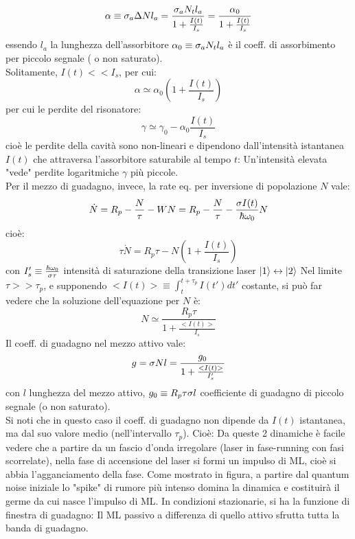 \begin{enumerate}
\begin{equation*}
\alpha \equiv \sigma_a \Delta N l_a = \frac{\sigma_a N_t l_a}{1 + \frac{I(t)}{I_s}} = \frac{\alpha_0}{1 + \frac{I(t)}{I_s}}
\end{equation*}
essendo $l_a$ la lunghezza dell'assorbitore $\alpha_0 \equiv \sigma_a N_t l_a$ è il coeff. di assorbimento per piccolo segnale ( o non saturato).\\
Solitamente, $I(t) << I_s$, per cui:
\begin{equation*}
\alpha \simeq \alpha_0 \left(1 + \frac{I(t)}{I_s}\right)
\end{equation*}
per cui le perdite del risonatore:
\begin{equation*}
\gamma \simeq \gamma_0 - \alpha_0 \frac{I(t)}{I_s}
\end{equation*}
cioè le perdite della cavità sono non-lineari e dipendono dall'intensità istantanea $I(t)$ che attraversa l'assorbitore saturabile al tempo $t$: Un'intensità elevata "vede" perdite logaritmiche $\gamma$ più piccole.\\
Per il mezzo di guadagno, invece, la rate eq. per inversione di popolazione $N$ vale:
\begin{equation*}
\dot{N} = R_p - \frac{N}{\tau} - WN = R_p - \frac{N}{\tau} - \frac{\sigma I(t)}{\hbar\omega_0} N
\end{equation*}
cioè:
\begin{equation*}
\tau \dot{N} = R_p\tau - N\left(1+\frac{I(t)}{I_s}\right)
\end{equation*}
con $I_s' \equiv \frac{\hbar\omega_0}{\sigma \tau}$ intensità di saturazione della transizione laser $|1\rangle \leftrightarrow |2\rangle$
Nel limite $\tau >> \tau_p$, e supponendo $<I(t)> \equiv \int_t^{t+\tau_p} I(t') dt'$ costante, si può far vedere che la soluzione dell'equazione per $N$ è:
\begin{equation*}
N \simeq \frac{R_p\tau}{1 + \frac{<I(t)>}{I_s}}
\end{equation*}
Il coeff. di guadagno nel mezzo attivo vale:
\begin{equation*}
g = \sigma N l = \frac{g_0}{1 + \frac{<I(t)>}{I_s'}}
\end{equation*}
con $l$ lunghezza del mezzo attivo, $g_0 \equiv R_p \tau \sigma l$ coefficiente di guadagno di piccolo segnale (o non saturato).\\
Si noti che in questo caso il coeff. di guadagno non dipende da $I(t)$ istantanea, ma dal suo valore medio (nell'intervallo $\tau_p$). Cioè:
Da queste 2 dinamiche è facile vedere che a partire da un fascio d'onda irregolare (laser in fase-running con fasi scorrelate), nella fase di accensione del laser si formi un impulso di ML, cioè si abbia l'agganciamento della fase.
Come mostrato in figura, a partire dal quantum noise iniziale lo "spike" di rumore più intenso domina la dinamica e costituirà il germe da cui nasce l'impulso di ML. In condizioni stazionarie, si ha la funzione di finestra di guadagno:
Il ML passivo a differenza di quello attivo sfrutta tutta la banda di guadagno.


\end{enumerate}
